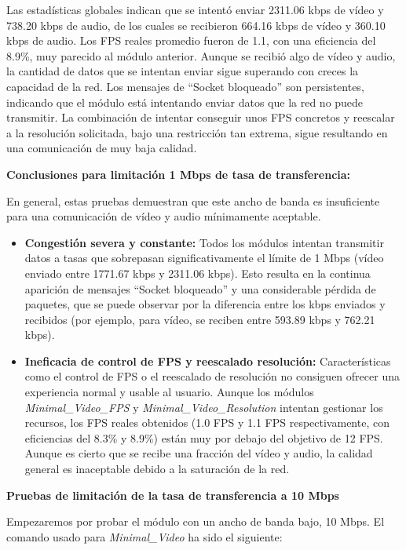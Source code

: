 Las estadísticas globales indican que se intentó enviar 2311.06 kbps de vídeo y 738.20 kbps de audio, de los cuales se recibieron 664.16 kbps de vídeo y 360.10 kbps de audio. Los FPS reales promedio fueron de 1.1, con una eficiencia del 8.9\%, muy parecido al módulo anterior. Aunque se recibió algo de vídeo y audio, la cantidad de datos que se intentan enviar sigue superando con creces la capacidad de la red. Los mensajes de ``Socket bloqueado'' son persistentes, indicando que el módulo está intentando enviar datos que la red no puede transmitir. La combinación de intentar conseguir unos FPS concretos y reescalar a la resolución solicitada, bajo una restricción tan extrema, sigue resultando en una comunicación de muy baja calidad.

\textbf{Conclusiones para limitación 1 Mbps de tasa de transferencia:}

En general, estas pruebas demuestran que este ancho de banda es insuficiente para una comunicación de vídeo y audio mínimamente aceptable.
\begin{itemize}
\item \textbf{Congestión severa y constante:} Todos los módulos intentan transmitir datos a tasas que sobrepasan significativamente el límite de 1 Mbps (vídeo enviado entre 1771.67 kbps y 2311.06 kbps). Esto resulta en la continua aparición de mensajes ``Socket bloqueado'' y una considerable pérdida de paquetes, que se puede observar por la diferencia entre los kbps enviados y recibidos (por ejemplo, para vídeo, se reciben entre 593.89 kbps y 762.21 kbps).
\item \textbf{Ineficacia de control de FPS y reescalado resolución:} Características como el control de FPS o el reescalado de resolución no consiguen ofrecer una experiencia normal y usable al usuario. Aunque los módulos \textit{Minimal\_Video\_FPS} y \textit{Minimal\_Video\_Resolution} intentan gestionar los recursos, los FPS reales obtenidos (1.0 FPS y 1.1 FPS respectivamente, con eficiencias del 8.3\% y 8.9\%) están muy por debajo del objetivo de 12 FPS. Aunque es cierto que se recibe una fracción del vídeo y audio, la calidad general es inaceptable debido a la saturación de la red.
\end{itemize}

\newpage

\textbf{Pruebas de limitación de la tasa de transferencia a 10 Mbps}
\vspace{\baselineskip}

Empezaremos por probar el módulo con un ancho de banda bajo, 10 Mbps. El comando usado para \textit{Minimal\_Video} ha sido el siguiente:

